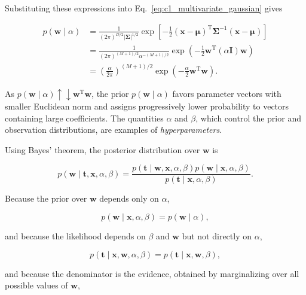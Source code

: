 \documentclass[10pt,twocolumn]{memoir}
\begin{document}
Substituting these expressions into Eq.~\ref{eq:c1_multivariate_gaussian} gives

\begin{equation}
\begin{aligned}
    p(\mathbf{w}\mid\alpha)
    &= \frac{1}{(2\pi)^{D/2}|\boldsymbol{\Sigma}|^{1/2}}\exp\left[-\frac{1}{2}(\mathbf{x}-\boldsymbol{\mu})^{\mathrm{T}}\boldsymbol{\Sigma}^{-1}(\mathbf{x}-\boldsymbol{\mu})\right]\\
    &=
    \frac{1}{(2\pi)^{(M+1)/2}\alpha^{-(M+1)/2}}\exp\left(-\frac{1}{2}\mathbf{w}^{\mathrm{T}}(\alpha\mathbf{I})\mathbf{w}\right) \\
    &=
    \left(\frac{\alpha}{2\pi}\right)^{(M+1)/2}\exp\left(-\frac{\alpha}{2}\mathbf{w}^{\mathrm{T}}\mathbf{w}\right).
\end{aligned}
\label{eq:c1_gaussian_prior}
\end{equation}

As $p(\mathbf{w}\mid\alpha)\uparrow\downarrow\mathbf{w}^{\mathrm{T}}\mathbf{w}$, the prior $p(\mathbf{w}\mid\alpha)$ favors parameter vectors with smaller Euclidean norm and assigns progressively lower probability to vectors containing large coefficients. The quantities $\alpha$ and $\beta$, which control the prior and observation distributions, are examples of \textit{hyperparameters}.

Using Bayes' theorem, the posterior distribution over $\mathbf{w}$ is

\begin{equation}
    p(\mathbf{w}\mid\mathbf{t},\mathbf{x},\alpha,\beta) = \frac{p(\mathbf{t}\mid\mathbf{w},\mathbf{x},\alpha,\beta)p(\mathbf{w}\mid\mathbf{x},\alpha,\beta)}{p(\mathbf{t}\mid\mathbf{x},\alpha,\beta)}.
\end{equation}

Because the prior over $\mathbf{w}$ depends only on $\alpha$,

\begin{equation}
    p(\mathbf{w}\mid\mathbf{x},\alpha,\beta) = p(\mathbf{w}\mid\alpha),
\end{equation}

and because the likelihood depends on $\beta$ and $\mathbf{w}$ but not directly on $\alpha$,

\begin{equation}
    p(\mathbf{t}\mid\mathbf{x},\mathbf{w},\alpha,\beta) = p(\mathbf{t}\mid\mathbf{x},\mathbf{w},\beta),
\end{equation}

and because the denominator is the evidence, obtained by marginalizing over all possible values of $\mathbf{w}$,
\end{document}
